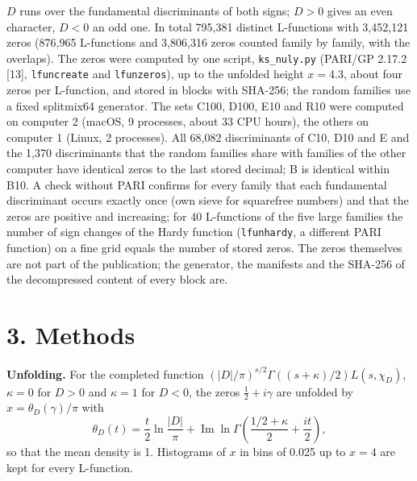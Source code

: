\documentclass[
  10pt,
]{article}
\begin{document}
\(D\) runs over the fundamental discriminants of both signs; \(D > 0\)
gives an even character, \(D < 0\) an odd one. In total 795,381 distinct
L-functions with 3,452,121 zeros (876,965 L-functions and 3,806,316
zeros counted family by family, with the overlaps). The zeros were
computed by one script, \texttt{ks\_nuly.py} (PARI/GP 2.17.2 {[}13{]},
\texttt{lfuncreate} and \texttt{lfunzeros}), up to the unfolded height
\(x = 4.3\), about four zeros per L-function, and stored in blocks with
SHA-256; the random families use a fixed splitmix64 generator. The sets
C100, D100, E10 and R10 were computed on computer 2 (macOS, 9 processes,
about 33 CPU hours), the others on computer 1 (Linux, 2 processes). All
68,082 discriminants of C10, D10 and E and the 1,370 discriminants that
the random families share with families of the other computer have
identical zeros to the last stored decimal; B is identical within B10. A
check without PARI confirms for every family that each fundamental
discriminant occurs exactly once (own sieve for squarefree numbers) and
that the zeros are positive and increasing; for 40 L-functions of the
five large families the number of sign changes of the Hardy function
(\texttt{lfunhardy}, a different PARI function) on a fine grid equals
the number of stored zeros. The zeros themselves are not part of the
publication; the generator, the manifests and the SHA-256 of the
decompressed content of every block are.

\hypertarget{methods}{%
\section{3. Methods}\label{methods}}

\textbf{Unfolding.} For the completed function
\((|D|/\pi)^{s/2}\Gamma((s + \kappa)/2) L(s, \chi_D)\), \(\kappa = 0\)
for \(D > 0\) and \(\kappa = 1\) for \(D < 0\), the zeros
\(\frac12 + i\gamma\) are unfolded by \(x = \theta_D(\gamma)/\pi\) with
\[\theta_D(t) = \frac{t}{2}\ln\frac{|D|}{\pi} + \operatorname{Im}\ln\Gamma\!\left(\frac{1/2 + \kappa}{2} + \frac{it}{2}\right),\]
so that the mean density is 1. Histograms of \(x\) in bins of 0.025 up
to \(x = 4\) are kept for every L-function.
\end{document}
